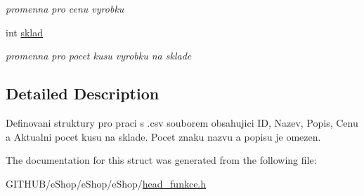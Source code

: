 \begin{DoxyCompactItemize}
\begin{DoxyCompactList}\small\item\em promenna pro cenu vyrobku \end{DoxyCompactList}\item 
\hypertarget{structvyrobek_a562c468543071606c87c9e5c9f20fe6a}{int \hyperlink{structvyrobek_a562c468543071606c87c9e5c9f20fe6a}{sklad}}\label{structvyrobek_a562c468543071606c87c9e5c9f20fe6a}

\begin{DoxyCompactList}\small\item\em promenna pro pocet kusu vyrobku na sklade \end{DoxyCompactList}\end{DoxyCompactItemize}


\subsection{Detailed Description}
Definovani struktury pro praci s .csv souborem obsahujici I\-D, Nazev, Popis, Cenu a Aktualni pocet kusu na sklade. Pocet znaku nazvu a popisu je omezen. 

The documentation for this struct was generated from the following file\-:\begin{DoxyCompactItemize}
\item 
G\-I\-T\-H\-U\-B/e\-Shop/e\-Shop/e\-Shop/\hyperlink{head__funkce_8h}{head\-\_\-funkce.\-h}\end{DoxyCompactItemize}
